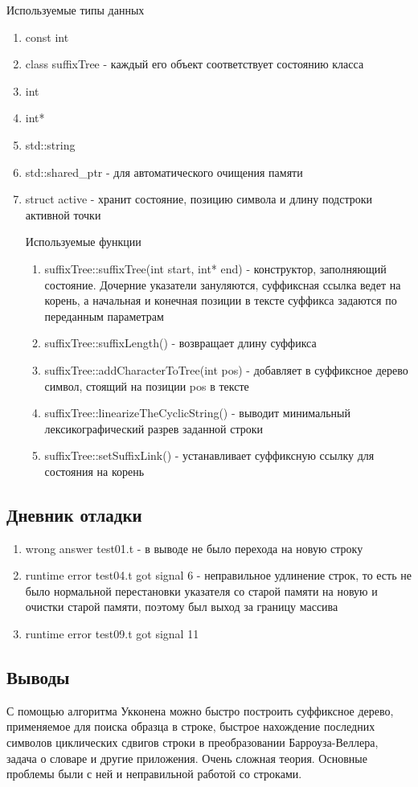 \documentclass[12pt]{article}
\begin{document}
Используемые типы данных
\begin{enumerate}
\item const int
\item class suffixTree - каждый его объект соответствует состоянию класса
\item int
\item int*
\item std::string
\item std::shared\_ptr - для автоматического очищения памяти
\item struct active - хранит состояние, позицию символа и длину подстроки активной точки

Используемые функции
\begin{enumerate}
\item suffixTree::suffixTree(int start, int* end) - конструктор, заполняющий состояние. Дочерние указатели зануляются, суффиксная ссылка ведет на корень, а начальная и конечная позиции в тексте суффикса задаются по переданным параметрам
\item suffixTree::suffixLength() - возвращает длину суффикса
\item suffixTree::addCharacterToTree(int pos) - добавляет в суффиксное дерево символ, стоящий на позиции pos в тексте
\item suffixTree::linearizeTheCyclicString() - выводит минимальный лексикографический разрев заданной строки
\item suffixTree::setSuffixLink() - устанавливает суффиксную ссылку для состояния на корень
\end{enumerate}

\end{enumerate}

\subsection*{Дневник отладки}

\begin{enumerate}
\item wrong answer test01.t - в выводе не было перехода на новую строку
\item runtime error test04.t got signal 6 - неправильное удлинение строк, то есть не было нормальной перестановки указателя со старой памяти на новую и очистки старой памяти, поэтому был выход за границу массива
\item runtime error test09.t got signal 11
\end{enumerate}

\subsection*{Выводы}

С помощью алгоритма Укконена можно быстро построить суффиксное дерево, применяемое для поиска образца в строке, быстрое нахождение последних символов циклических сдвигов строки в преобразовании Барроуза-Веллера, задача о словаре и другие приложения. Очень сложная теория. Основные проблемы были с ней и неправильной работой со строками.
\end{document}
